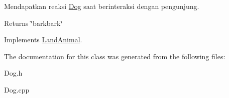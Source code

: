 Mendapatkan reaksi \hyperlink{classDog}{Dog} saat berinteraksi dengan pengunjung. 

\begin{DoxyReturn}{Returns}
\char`\"{}barkbark\char`\"{} 
\end{DoxyReturn}


Implements \hyperlink{classLandAnimal}{Land\-Animal}.



The documentation for this class was generated from the following files\-:\begin{DoxyCompactItemize}
\item 
Dog.\-h\item 
Dog.\-cpp\end{DoxyCompactItemize}
